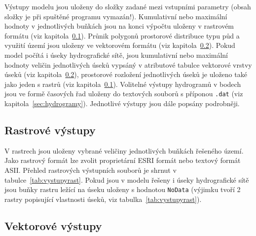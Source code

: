 


Výstupy modelu jsou uloženy do složky zadané mezi vstupními parametry (obsah složky je při spuštěné programu vymazán!). Kumulativní nebo maximální hodnoty v jednotlivých  buňkách jsou na konci výpočtu uloženy v rastrovém formátu (viz kapitola~\ref{sec:rastr}). Průnik polygonů prostorové distribuce typu půd a využití území jsou uloženy ve vektorovém formátu (viz kapitola~\ref{sec:vektor}). Pokud model \smod počítá i úseky hydrografické sítě, jsou kumulativní nebo maximální hodnoty veličin jednotlivých úseků vypsáný v atributové tabulce vektorové vrstvy úseků (viz kapitola~\ref{sec:vektor}), prostorové rozložení jednotlivých úseků je uloženo také jako jeden s rastrů (viz kapitola~\ref{sec:rastr}).  Volitelné výstupy hydrogramů  v bodech jsou ve formě časových řad uloženy do textových souborů s příponou {\tt.dat} (viz kapitola~\ref{sec:hydrogramy}).  Jednotlivé výstupy jsou dále popsány podrobněji. 













\subsection{Rastrové výstupy}\label{sec:rastr}

V rastrech jsou uloženy vybrané veličiny jednotlivých buňkách řešeného území. Jako rastrový formát lze zvolit proprietární ESRI formát nebo textový formát ASII. Přehled rastrových výstupních souborů je shrnut v tabulce~\ref{tab:vystupyrast}. Pokud jsou v modelu řešeny i úseky hydrografické sítě jsou buňky rastru ležící na úseku uloženy s hodnotou {\tt NoData} (výjimku tvoří 2 rastry popisující vlastnosti úseků, viz tabulka~\ref{tab:vystupyrast}).  










\subsection{Vektorové výstupy}\label{sec:vektor}

